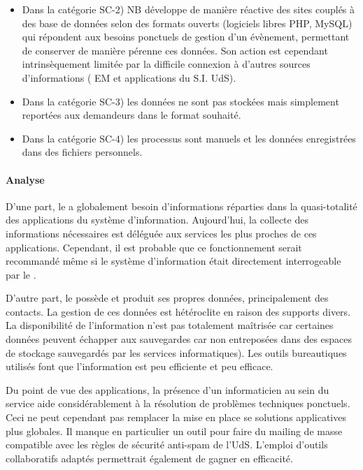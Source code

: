 \documentclass{book}
\begin{document}
\begin{itemize}
\item Dans la catégorie SC-2) NB développe de manière réactive des sites couplés 
	à des base de données selon des formats ouverts (logiciels libres PHP, 
	MySQL) qui répondent aux besoins ponctuels de gestion d'un évènement, 
	permettant de conserver de manière pérenne ces données. Son action est 
	cependant intrinsèquement limitée par la difficile connexion à d'autres 
	sources d'informations ( EM et applications du S.I. UdS).

\item Dans la catégorie SC-3) les données ne sont pas stockées mais simplement 
	reportées aux demandeurs dans le format souhaité.

\item Dans la catégorie SC-4) les processus sont manuels et les données 
	enregistrées dans des fichiers personnels.
\end{itemize}

\paragraph{Analyse}

D'une part, le \scom a globalement besoin d'informations réparties dans la 
quasi-totalité des applications du système d'information. Aujourd'hui, la 
collecte des informations nécessaires est déléguée aux services les plus 
proches de ces applications. Cependant, il est probable que ce fonctionnement 
serait recommandé même si le système d'information était directement 
interrogeable par le \scom.

D'autre part, le \scom possède et produit ses propres données, principalement 
des contacts. La gestion de ces données est hétéroclite en raison des supports 
divers. La disponibilité de l'information n'est pas totalement maîtrisée car 
certaines données peuvent échapper aux sauvegardes car non entreposées dans des 
espaces de stockage sauvegardés par les services informatiques). Les outils 
bureautiques utilisés font que l'information est peu efficiente et peu efficace. 


Du point de vue des applications, la présence d'un informaticien au sein du 
service aide considérablement à la résolution de problèmes techniques ponctuels. 
Ceci ne peut cependant pas remplacer la mise en place se solutions applicatives 
plus globales. Il manque en particulier un outil pour faire du mailing de masse 
compatible avec les règles de sécurité anti-spam de l'UdS. L'emploi d'outils 
collaboratifs adaptés permettrait également de gagner en efficacité. 
\end{document}
